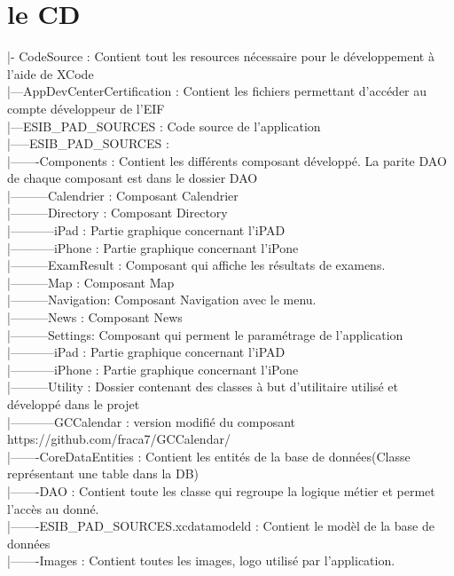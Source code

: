 \documentclass[12pt,a4paper,twoside]{report}
\begin{document}
\section{le CD}
 |- CodeSource : Contient tout les resources nécessaire pour le développement à l'aide de XCode\\
 |---AppDevCenterCertification : Contient les fichiers permettant d'accéder au compte développeur de l'EIF \\
 |---ESIB\_PAD\_SOURCES : Code source de l'application \\
 |-----ESIB\_PAD\_SOURCES : \\
 |-------Components : Contient les différents composant développé. La parite DAO de chaque composant est dans le dossier  DAO \\
 |---------Calendrier : Composant Calendrier\\
 |---------Directory : Composant Directory\\
 |-----------iPad : Partie graphique concernant l'iPAD\\
 |-----------iPhone : Partie graphique concernant l'iPone \\
 |---------ExamResult : Composant qui affiche les résultats de examens.\\
 |---------Map : Composant Map\\
 |---------Navigation: Composant Navigation avec le menu.\\
 |---------News : Composant News \\
 |---------Settings: Composant qui perment le paramétrage de l'application\\
 |-----------iPad : Partie graphique concernant l'iPAD\\
 |-----------iPhone : Partie graphique concernant l'iPone\\
 |---------Utility : Dossier contenant des classes à but d'utilitaire utilisé et développé dans le projet \\
 |-----------GCCalendar : version modifié du composant https://github.com/fraca7/GCCalendar/ \\
 |-------CoreDataEntities : Contient les entités de la base de données(Classe représentant une table dans la DB)\\
 |-------DAO : Contient toute les classe qui regroupe la logique métier et permet l'accès au donné.\\
 |-------ESIB\_PAD\_SOURCES.xcdatamodeld : Contient le modèl de la base de données \\
 |-------Images : Contient toutes les images, logo utilisé par l'application.\\
\end{document}
